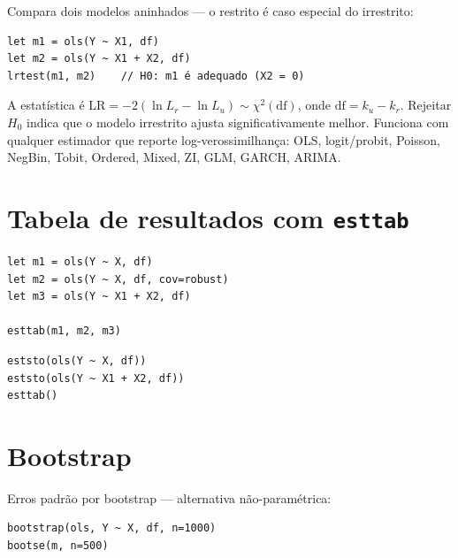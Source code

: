 Compara dois modelos aninhados — o restrito é caso especial do irrestrito:

\begin{lstlisting}
let m1 = ols(Y ~ X1, df)
let m2 = ols(Y ~ X1 + X2, df)
lrtest(m1, m2)    // H0: m1 é adequado (X2 = 0)
\end{lstlisting}

A estatística é $\mathrm{LR} = -2(\ln L_r - \ln L_u) \sim \chi^2(\mathrm{df})$,
onde $\mathrm{df} = k_u - k_r$. Rejeitar $H_0$ indica que o modelo irrestrito
ajusta significativamente melhor. Funciona com qualquer estimador que
reporte log-verossimilhança: OLS, logit/probit, Poisson, NegBin, Tobit,
Ordered, Mixed, ZI, GLM, GARCH, ARIMA.

\section{Tabela de resultados com \texttt{esttab}}

\begin{lstlisting}[caption={Comparação de especificações}]
let m1 = ols(Y ~ X, df)
let m2 = ols(Y ~ X, df, cov=robust)
let m3 = ols(Y ~ X1 + X2, df)

esttab(m1, m2, m3)
\end{lstlisting}

\begin{lstlisting}
eststo(ols(Y ~ X, df))
eststo(ols(Y ~ X1 + X2, df))
esttab()
\end{lstlisting}

\section{Bootstrap}

Erros padrão por bootstrap — alternativa não-paramétrica:

\begin{lstlisting}
bootstrap(ols, Y ~ X, df, n=1000)
bootse(m, n=500)
\end{lstlisting}

